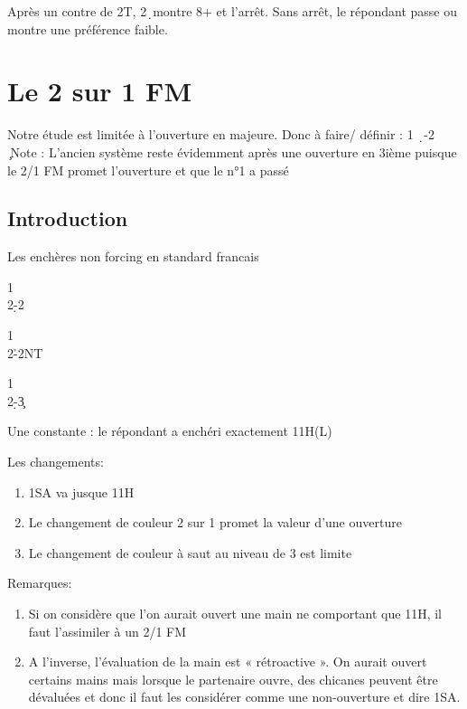 \documentclass[a4paper]{article}
\begin{document}
Après un contre de 2T, 2\d\ montre 8+ et l'arrêt. Sans arrêt, le répondant passe ou montre une préférence faible.

\section{Le 2 sur 1 FM}

Notre étude est limitée à l’ouverture en majeure. 
Donc à faire/ définir : 1 \d\ -2 \c\ 
Note : 
L’ancien système reste évidemment après une ouverture en 3ième puisque le 2/1 FM promet 
l’ouverture et que le n°1 a passé

\subsection{Introduction}

Les enchères non forcing en standard francais

\begin{bidtable}
1\c\\
2\d-2\s
\end{bidtable}

\begin{bidtable}
1\c\\
2\h-2NT
\end{bidtable}

\begin{bidtable}
1\c\\
2\d-3\c
\end{bidtable}

Une constante : le répondant a enchéri exactement 11H(L)

Les changements:

\begin{enumerate}
\item 1SA va jusque 11H

\item Le changement de couleur 2 sur 1 promet la valeur d’une ouverture

\item Le changement de couleur à saut au niveau de 3 est limite

\end{enumerate}

Remarques:

\begin{enumerate}
\item Si on considère que l’on aurait ouvert une main ne comportant que 11H, il faut 
l’assimiler à un 2/1 FM

\item A l’inverse, l’évaluation de la main est « rétroactive ». On aurait ouvert certains mains 
mais lorsque le partenaire ouvre, des chicanes peuvent être dévaluées et donc il faut les 
considérer comme une non-ouverture et dire 1SA.

\end{enumerate}
\end{document}
